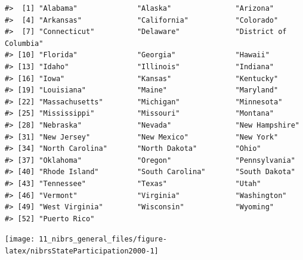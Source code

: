 \documentclass[
]{krantz}
\let\origfigure\figure
\let\endorigfigure\endfigure
\renewenvironment{figure}[1][2] {
    \expandafter\origfigure\expandafter[H]
} {
    \endorigfigure
}
\begin{document}
\begin{verbatim}
#>  [1] "Alabama"              "Alaska"               "Arizona"             
#>  [4] "Arkansas"             "California"           "Colorado"            
#>  [7] "Connecticut"          "Delaware"             "District of Columbia"
#> [10] "Florida"              "Georgia"              "Hawaii"              
#> [13] "Idaho"                "Illinois"             "Indiana"             
#> [16] "Iowa"                 "Kansas"               "Kentucky"            
#> [19] "Louisiana"            "Maine"                "Maryland"            
#> [22] "Massachusetts"        "Michigan"             "Minnesota"           
#> [25] "Mississippi"          "Missouri"             "Montana"             
#> [28] "Nebraska"             "Nevada"               "New Hampshire"       
#> [31] "New Jersey"           "New Mexico"           "New York"            
#> [34] "North Carolina"       "North Dakota"         "Ohio"                
#> [37] "Oklahoma"             "Oregon"               "Pennsylvania"        
#> [40] "Rhode Island"         "South Carolina"       "South Dakota"        
#> [43] "Tennessee"            "Texas"                "Utah"                
#> [46] "Vermont"              "Virginia"             "Washington"          
#> [49] "West Virginia"        "Wisconsin"            "Wyoming"             
#> [52] "Puerto Rico"
\end{verbatim}

\begin{figure}

{\centering \texttt{[image: 11\_nibrs\_general\_files/figure-latex/nibrsStateParticipation2000-1]} 

}

\caption{The percent of each state's population that is covered by police agencies reporting at least one month of data to NIBRS, 2000.}\label{fig:nibrsStateParticipation2000}
\end{figure}
\end{document}
